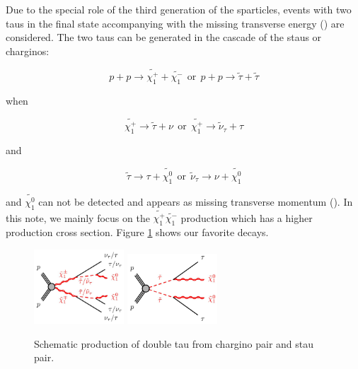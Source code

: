 Due to the special role of the third generation of the sparticles, events with two taus in the final state 
accompanying with the missing transverse energy (\met) are considered.
The two taus can be generated in the cascade of the staus or charginos:
\begin{linenomath}
\begin{equation}
p + p \rightarrow \tilde{\chi_{1}^{+}} + \tilde{\chi_{1}^{-}} ~~\mathrm{or}~~  p + p \rightarrow \tilde{\tau} + \tilde{\tau}
\end{equation}
\end{linenomath}
when 
\begin{linenomath}
\begin{equation}
\tilde{\chi_{1}^{+}} \rightarrow \tilde{\tau} + \nu ~~\mathrm{or}~~  \tilde{\chi_{1}^{+}} \rightarrow \tilde{\nu}_{\tau} + \tau 
\end{equation}
\end{linenomath}
and 
\begin{linenomath}
\begin{equation}
\tilde{\tau} \rightarrow \tau + \tilde{\chi_{1}^{0}} ~~\mathrm{or}~~  \tilde{\nu}_{\tau} \rightarrow \nu + \tilde{\chi_{1}^{0}} 
\end{equation}
\end{linenomath}
and $\tilde{\chi_{1}^{0}}$ can not be detected and appears as missing transverse momentum (\met).
In this note, we mainly focus on the $\tilde{\chi_{1}^{+}}\tilde{\chi_{1}^{-}}$ production which has a higher 
production cross section. Figure \ref{fig:Productions} shows our favorite decays.

\begin{figure}[!htb]
\centering
\includegraphics[width=0.3\textwidth]{Introductionfigs/DiChargino.png}
\includegraphics[width=0.3\textwidth]{Introductionfigs/DiSTau.png}
\caption{Schematic production of double tau from chargino pair and stau pair.}
\label{fig:Productions}
\end{figure}


